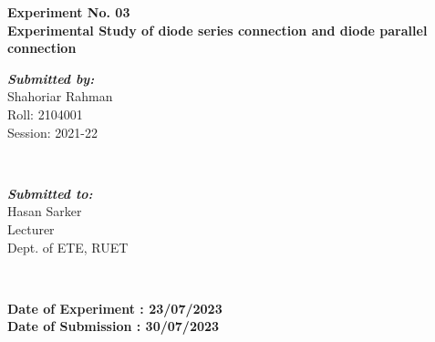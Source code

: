 \begin{titlepage}
\begin{center}
        \textbf{\Large  Experiment No. 03}
        \\[.25cm]
        \textbf{\large Experimental Study of diode series connection and diode parallel connection}
        \\
        \myrule[1pt][5pt]
        \begin{minipage}{0.4\textwidth}
            \vspace{0.5cm}
            \begin{flushleft}
                \emph{\textbf{\large Submitted by:}}
                \\
                Shahoriar Rahman \\
                Roll: 2104001 \\
                Session: 2021-22
            \end{flushleft}
        \end{minipage}
        ~
        \begin{minipage}{0.4\textwidth}
            \vspace{0.5cm}
            \begin{flushright}
                \emph{\textbf{\large Submitted to:}}
                \\
                Hasan Sarker
                \\
                Lecturer
                \\
                Dept. of ETE, RUET
                \\
            \end{flushright}
        \end{minipage}\\[0.7cm]
        \makeatother

        \textbf{Date of Experiment : 23/07/2023}\\
        \textbf{Date of Submission : 30/07/2023}\\[1cm]




\end{center}
\end{titlepage}
